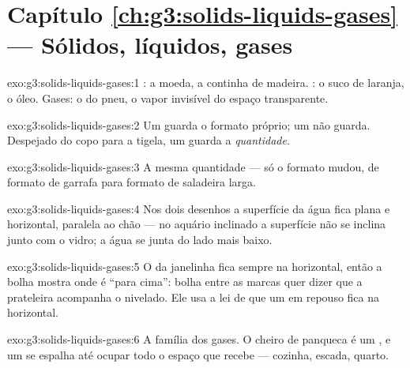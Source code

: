 \section*{Capítulo \ref{ch:g3:solids-liquids-gases} --- Sólidos, líquidos, gases}

\begin{solution}{exo:g3:solids-liquids-gases:1}
: a moeda, a continha de madeira. : o suco de laranja,
o óleo. Gases: o  do pneu, o vapor invisível do espaço
transparente.
\end{solution}

\begin{solution}{exo:g3:solids-liquids-gases:2}
Um  guarda o formato próprio; um  não guarda. Despejado
do copo para a tigela, um  guarda a \emph{quantidade}.
\end{solution}

\begin{solution}{exo:g3:solids-liquids-gases:3}
A mesma quantidade --- só o formato mudou, de formato de garrafa para
formato de saladeira larga.
\end{solution}

\begin{solution}{exo:g3:solids-liquids-gases:4}
Nos dois desenhos a superfície da água fica plana e horizontal,
paralela ao chão --- no aquário inclinado a superfície não se inclina
junto com o vidro; a água se junta do lado mais baixo.
\end{solution}

\begin{solution}{exo:g3:solids-liquids-gases:5}
O  da janelinha fica sempre na horizontal, então a bolha
mostra onde é ``para cima'': bolha entre as marcas quer dizer que a
prateleira acompanha o  nivelado. Ele usa a lei de que um
 em repouso fica na horizontal.
\end{solution}

\begin{solution}{exo:g3:solids-liquids-gases:6}
A família dos gases. O cheiro de panqueca é um , e um  se
espalha até ocupar todo o espaço que recebe --- cozinha, escada,
quarto.
\end{solution}

